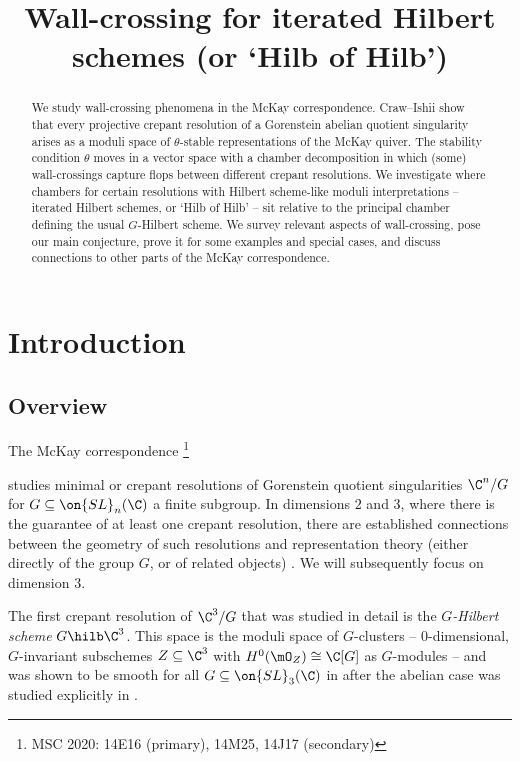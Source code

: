 \documentclass[leqno,11pt,a4paper]{amsart}
\newcommand\blfootnote[1]{%
  \begingroup
  \renewcommand\thefootnote{}\footnote{#1}%
  \addtocounter{footnote}{-1}%
  \endgroup
}
\begin{document}
\title[Wall-crossing for iterated Hilbert schemes]{Wall-crossing for iterated Hilbert schemes (or `Hilb of Hilb')}
\vs
\maketitle

\begin{abstract} We study wall-crossing phenomena in the McKay correspondence. Craw--Ishii show that every projective crepant resolution of a Gorenstein abelian quotient singularity arises as a moduli space of $\theta$-stable representations of the McKay quiver. The stability condition $\theta$ moves in a vector space with a chamber decomposition in which (some) wall-crossings capture flops between different crepant resolutions. We investigate where chambers for certain resolutions with Hilbert scheme-like moduli interpretations -- iterated Hilbert schemes, or `Hilb of Hilb' -- sit relative to the principal chamber defining the usual $G$-Hilbert scheme. We survey relevant aspects of wall-crossing, pose our main conjecture, prove it for some examples and special cases, and discuss connections to other parts of the McKay correspondence.
\end{abstract}

\section{Introduction}

\subsection{Overview}

The McKay correspondence\blfootnote{MSC 2020: 14E16 (primary), 14M25, 14J17 (secondary)} studies minimal or crepant resolutions of Gorenstein quotient singularities $\C^n/G$ for $G\subseteq\on{SL}_n(\C)$ a finite subgroup. In dimensions $2$ and $3$, where there is the guarantee of at least one crepant resolution, there are established connections between the geometry of such resolutions and representation theory (either directly of the group $G$, or of related objects) \cite{av_ref_85,bd_stro_96,in_mck_00,mck_car_81,rei_cor_02}. We will subsequently focus on dimension $3$.

The first crepant resolution of $\C^3/G$ that was studied in detail is the \emph{$G$-Hilbert scheme} $G\hilb\C^3$. This space is the moduli space of $G$-clusters -- $0$-dimensional, $G$-invariant subschemes $Z\subseteq\C^3$ with $H^0(\mO_Z)\cong\C[G]$ as $G$-modules -- and was shown to be smooth for all $G\subseteq\on{SL}_3(\C)$ in \cite{bkr_mck_01} after the abelian case was studied explicitly in \cite{nak_hil_01}.
\end{document}
